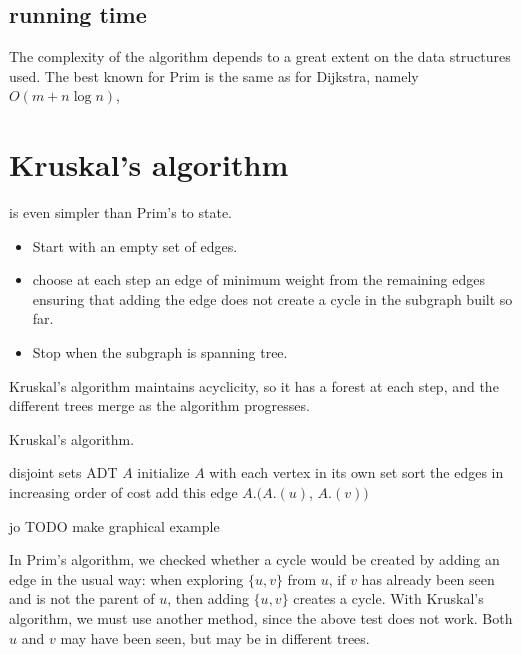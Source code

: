 \subsection{running time}

The complexity of the algorithm depends to a great extent on the data
structures used. The best known for Prim is the same as for Dijkstra,
namely $O(m + n\log n)$,

\section{Kruskal's algorithm}

 is even simpler than Prim's to state.
\begin{itemize}
\item Start with an empty set of edges.
\item choose at each step an edge of minimum weight from the remaining edges ensuring that adding the edge does not create a cycle in the subgraph built so
far. 
\item Stop when the subgraph is spanning tree.
\end{itemize}


Kruskal's algorithm maintains acyclicity, so it has a forest
at each step, and the different trees merge as the algorithm progresses.


\begin{algorithm}[H]
  \caption{Kruskal's algorithm.}
  \label{alg:kruskal}
\begin{algorithmic}[1]
	\State disjoint sets ADT $A$
	\State initialize $A$ with each vertex in its own set
	\State sort the edges in increasing order of cost
			\State add this edge
			\State $A$.$(A$.$(u)$, $A$.$(v))$
		\EndIf
	\EndFor
	\State {}
\EndFunction
\end{algorithmic}
\end{algorithm}

jo TODO make graphical example

In Prim's algorithm, we checked whether a cycle would be created by adding
an edge in the usual way: when exploring $\{u, v\}$ from $u$, if $v$ has
already been seen and is not the parent of $u$, then adding $\{u, v\}$
creates a cycle. With Kruskal's algorithm, we must use another method,
since the above test does not work. Both $u$ and $v$ may have been seen,
but may be in different trees.

